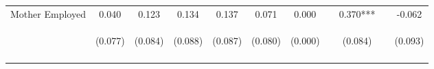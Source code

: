 \begin{tabular}{lcccccccccc}
\noalign{\smallskip}Mother Employed & 0.040 & 0.123 & 0.134 & 0.137 & 0.071 & 0.000 &  & 0.370*** &  & -0.062\\
 & \begin{footnotesize}(0.077)\end{footnotesize} & \begin{footnotesize}(0.084)\end{footnotesize} & \begin{footnotesize}(0.088)\end{footnotesize} & \begin{footnotesize}(0.087)\end{footnotesize} & \begin{footnotesize}(0.080)\end{footnotesize} & \begin{footnotesize}(0.000)\end{footnotesize} & \begin{footnotesize}\end{footnotesize} & \begin{footnotesize}(0.084)\end{footnotesize} & \begin{footnotesize}\end{footnotesize} & \begin{footnotesize}(0.093)\end{footnotesize}\\
\noalign{\smallskip}\hline\end{tabular}\\
